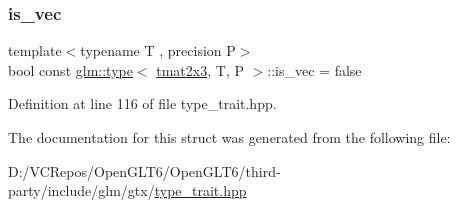 \subsubsection{\texorpdfstring{is\_vec}{is\_vec}}
{\footnotesize\ttfamily template$<$typename T , precision P$>$ \\
bool const \mbox{\hyperlink{structglm_1_1type}{glm\+::type}}$<$ \mbox{\hyperlink{structglm_1_1tmat2x3}{tmat2x3}}, T, P $>$\+::is\+\_\+vec = false\hspace{0.3cm}{\ttfamily [static]}}



Definition at line 116 of file type\+\_\+trait.\+hpp.



The documentation for this struct was generated from the following file\+:\begin{DoxyCompactItemize}
\item 
D\+:/\+V\+C\+Repos/\+Open\+G\+L\+T6/\+Open\+G\+L\+T6/third-\/party/include/glm/gtx/\mbox{\hyperlink{type__trait_8hpp}{type\+\_\+trait.\+hpp}}\end{DoxyCompactItemize}
